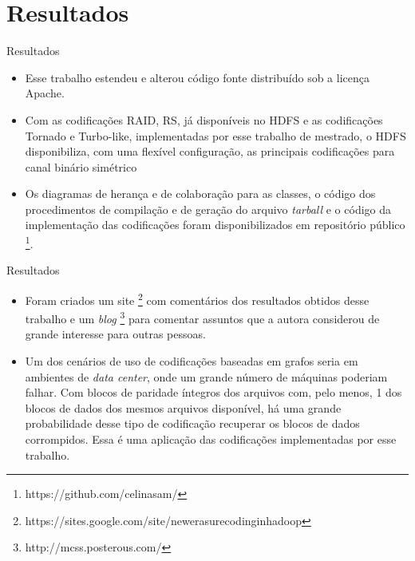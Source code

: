 \section{Resultados}

\begin{frame}{Resultados}

   \begin{itemize}

      \item Esse trabalho estendeu e alterou código fonte distribuído sob a licença Apache. 

      \item Com as codificações RAID, RS, já disponíveis no HDFS e as codificações Tornado e Turbo-like, implementadas por esse trabalho de mestrado, o HDFS disponibiliza, com uma flexível configuração, as principais codificações para canal binário simétrico

      \item Os diagramas de herança e de colaboração para as classes, o código dos procedimentos de compilação e de geração do arquivo \emph{tarball} e o código da implementação das codificações foram disponibilizados em repositório público \footnote{https://github.com/celinasam/}.

  \end{itemize}

\end{frame}

\begin{frame}{Resultados}

   \begin{itemize}

      \item Foram criados um site \footnote{https://sites.google.com/site/newerasurecodinginhadoop} com comentários dos resultados obtidos desse trabalho e um \emph{blog} \footnote{http://mcss.posterous.com/} para comentar assuntos que a autora considerou de grande interesse para outras pessoas.

      \item Um dos cenários de uso de codificações baseadas em grafos seria em ambientes de \emph{data center}, onde um grande número de máquinas poderiam falhar. Com blocos de paridade íntegros dos arquivos com, pelo menos, 1 dos blocos de dados dos mesmos arquivos disponível, há uma grande probabilidade desse tipo de codificação recuperar os blocos de dados corrompidos. Essa é uma aplicação das codificações implementadas por esse trabalho.
  \end{itemize}

\end{frame}

